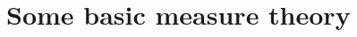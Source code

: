 \documentclass[11pt, letter]{book}
\newtheorem{theorem}{Theorem}[section]
\newtheorem{definition}[theorem]{Definition}
\newtheorem{proposition}[theorem]{Proposition}
\begin{document}



\section{Some basic measure theory}\label{sec:measure_theory}

\end{document}
